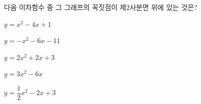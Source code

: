 \hspace*{2mm}\begin{minipage}[t]{\dimexpr\linewidth-2mm\relax}\vspace{0pt}
다음 이차함수 중 그 그래프의 꼭짓점이 제$2$사분면 위에 있는 것은?
\begin{choicesii}{\rule[-3ex]{0pt}{8ex}$y=x^2-4x+1$}{\rule[-3ex]{0pt}{8ex}$y=-x^2-6x-11$}{\rule[-3ex]{0pt}{8ex}$y=2x^2+2x+3$}{\rule[-3ex]{0pt}{8ex}$y=3x^2-6x$}{\rule[-3ex]{0pt}{8ex}$y=\dfrac{1}{2}x^2-2x+3$}\end{choicesii}\end{minipage}
